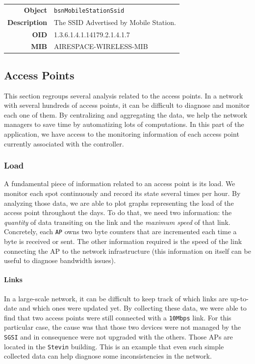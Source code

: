 \begin{tabular}{|r l|}
\hline
\textbf{Object} & \texttt{bsnMobileStationSsid} \\
\textbf{Description} & \parbox{11cm}{The SSID Advertised by Mobile Station.} \\
\textbf{OID} & 1.3.6.1.4.1.14179.2.1.4.1.7 \\
\textbf{MIB} & AIRESPACE-WIRELESS-MIB \\
\hline
\end{tabular}

\subsection{Access Points}
This section regroups several analysis related to the access points. In a network with several hundreds of access points, it can be difficult to diagnose and monitor each one of them. By centralizing and aggregating the data, we help the network managers to save time by automatizing lots of computations. In this part of the application, we have access to the monitoring information of each access point currently associated with the controller.

\subsubsection*{Load}
A fundamental piece of information related to an access point is its load. We monitor each spot continuously and record its state several times per hour. By analyzing those data, we are able to plot graphs representing the load of the access point throughout the days. To do that, we need two information: the \textit{quantity} of data transiting on the link and the \textit{maximum speed} of that link. Concretely, each \texttt{AP} owns two byte counters that are incremented each time a byte is received or sent. The other information required is the speed of the link connecting the AP to the network infrastructure (this information on itself can be useful to diagnose bandwidth issues).

\paragraph*{Links} In a large-scale network, it can be difficult to keep track of which links are up-to-date and which ones were updated yet. By collecting these data, we were able to find that two access points were still connected with a \texttt{10Mbps} link. For this particular case, the cause was that those two devices were not managed by the \texttt{SGSI} and in consequence were not upgraded with the others. Those APs are located in the \texttt{Stevin} building.
This is an example that even such simple collected data can help diagnose some inconsistencies in the network.

